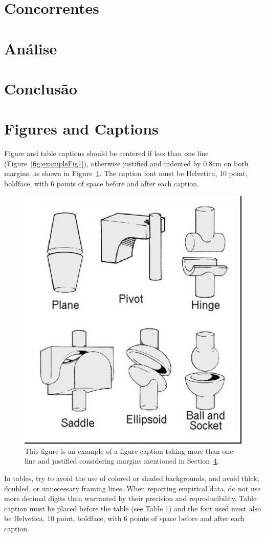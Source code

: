 \documentclass[12pt]{article}
\begin{document}
\section{Concorrentes}

\section{Análise}
\section{Conclusão}

\section{Figures and Captions}\label{sec:figs}


Figure and table captions should be centered if less than one line
(Figure~\ref{fig:exampleFig1}), otherwise justified and indented by 0.8cm on
both margins, as shown in Figure~\ref{fig:exampleFig2}. The caption font must
be Helvetica, 10 point, boldface, with 6 points of space before and after each
caption.

\begin{figure}[ht]
\centering
\includegraphics[width=.3\textwidth]{fig2.jpg}
\caption{This figure is an example of a figure caption taking more than one
  line and justified considering margins mentioned in Section~\ref{sec:figs}.}
\label{fig:exampleFig2}
\end{figure}

In tables, try to avoid the use of colored or shaded backgrounds, and avoid
thick, doubled, or unnecessary framing lines. When reporting empirical data,
do not use more decimal digits than warranted by their precision and
reproducibility. Table caption must be placed before the table (see Table 1)
and the font used must also be Helvetica, 10 point, boldface, with 6 points of
space before and after each caption.
\end{document}
